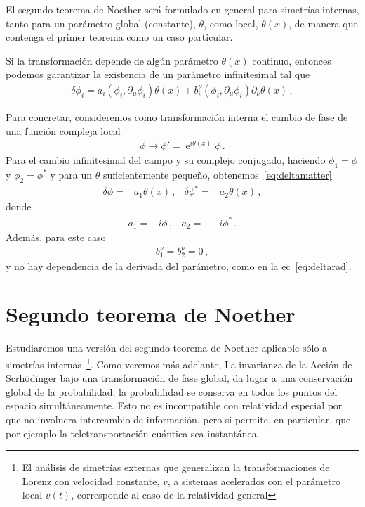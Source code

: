 El segundo teorema de Noether será formulado en general para simetrías internas, tanto para un parámetro global (constante), $\theta$, como local, $\theta(x)$, de manera que contenga el primer teorema como un caso particular.



Si la transformación depende de algún parámetro $\theta(x)$ continuo, entonces podemos garantizar la existencia de un parámetro infinitesimal tal que
\begin{align}
\label{eq:infdt}
 \delta\phi_i= a_{i}\left( \phi_{i},\partial_{\mu}\phi_{i} \right) \theta(x)+b^{\nu}_i \left( \phi_{i},\partial_{\mu}\phi_{i} \right) \partial_{\nu}\theta(x)\,,
\end{align}


Para concretar, consideremos como transformación interna el cambio de fase de una función compleja local
\begin{align}
  \phi\to \phi'=\operatorname{e}^{i\theta(x)}\phi\,.
\end{align}
Para el cambio infinitesimal del campo y su complejo conjugado,  haciendo $\phi_1=\phi$ y $\phi_2=\phi^{*}$ y
para un $\theta$ suficientemente pequeño, obtenemos~\eqref{eq:deltamatter}
\begin{align}
  \delta\phi=&a_1 \theta(x)\,, &  \delta\phi^{*}=&  a_2 \theta(x)\,, 
\end{align}
donde
\begin{align}
  \label{eq:ai}
  a_1=& i\phi \,, & a_2=&-i\phi^{*}\,.
\end{align}
Además, para este caso
\begin{align}
  b_1^\nu=b_2^\nu=0\,,
\end{align}
y no hay dependencia de la derivada del parámetro, como en la ec~\eqref{eq:deltarad}.



\section{Segundo teorema de Noether}

Estudiaremos  una versión del segundo teorema de Noether aplicable sólo a simetrías internas~\footnote{El análisis de simetrías externas que generalizan la transformaciones de Lorenz con velocidad constante, $v$, a sistemas acelerados con el parámetro local $v(t)$, corresponde al caso de la relatividad general}. Como veremos más adelante, La invarianza de la Acción de Scrhödinger bajo una transformación de fase global, da lugar a una conservación global de la probabilidad: la probabilidad se conserva en todos los puntos del espacio simultáneamente. Esto no es incompatible con relatividad especial por que no involucra intercambio de información, pero si permite, en particular, que por ejemplo la teletransportación cuántica sea instantánea.


